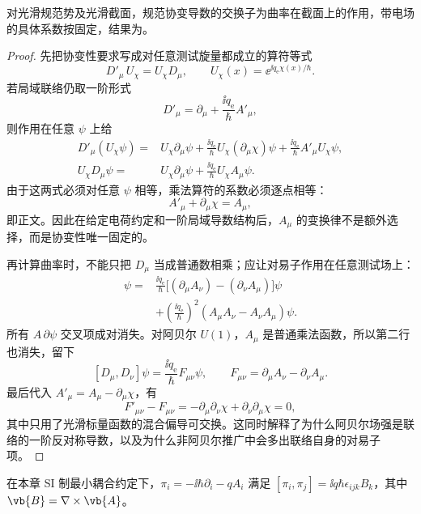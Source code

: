 \begin{lemma}[协变导数的交换子]
对光滑规范势及光滑截面，规范协变导数的交换子为曲率在截面上的作用，带电场的具体系数按固定，结果为。
\end{lemma}

\begin{proof}
先把协变性要求写成对任意测试旋量都成立的算符等式
\[
D'_\mu\,U_\chi=U_\chi D_\mu,
\qquad
U_\chi(x)=\ee^{\ii q_{\mathrm e}\chi(x)/\hbar}.
\]
若局域联络仍取一阶形式
\[
D'_\mu=\partial_\mu+\frac{\ii q_{\mathrm e}}{\hbar}A'_\mu,
\]
则作用在任意 $\psi$ 上给
\begin{align*}
D'_\mu(U_\chi\psi)
={}&U_\chi\partial_\mu\psi
+\frac{\ii q_{\mathrm e}}{\hbar}U_\chi(\partial_\mu\chi)\psi
+\frac{\ii q_{\mathrm e}}{\hbar}A'_\mu U_\chi\psi,\\
U_\chi D_\mu\psi
={}&U_\chi\partial_\mu\psi
+\frac{\ii q_{\mathrm e}}{\hbar}U_\chi A_\mu\psi.
\end{align*}
由于这两式必须对任意 $\psi$ 相等，乘法算符的系数必须逐点相等：
\[
A'_\mu+\partial_\mu\chi=A_\mu,
\]
即正文。因此在给定电荷约定和一阶局域导数结构后，$A_\mu$ 的变换律不是额外选择，而是协变性唯一固定的。

再计算曲率时，不能只把 $D_\mu$ 当成普通数相乘；应让对易子作用在任意测试场上：
\begin{align*}
[D_\mu,D_\nu]\psi
={}&\frac{\ii q_{\mathrm e}}{\hbar}
\bigl[(\partial_\mu A_\nu)-(\partial_\nu A_\mu)\bigr]\psi\\
&+\left(\frac{\ii q_{\mathrm e}}{\hbar}\right)^2
(A_\mu A_\nu-A_\nu A_\mu)\psi.
\end{align*}
所有 $A\,\partial\psi$ 交叉项成对消失。对阿贝尔 $U(1)$，$A_\mu$ 是普通乘法函数，所以第二行也消失，留下
\[
[D_\mu,D_\nu]\psi
=\frac{\ii q_{\mathrm e}}{\hbar}F_{\mu\nu}\psi,
\qquad
F_{\mu\nu}=\partial_\mu A_\nu-\partial_\nu A_\mu.
\]
最后代入 $A'_\mu=A_\mu-\partial_\mu\chi$，有
\[
F'_{\mu\nu}-F_{\mu\nu}
=-\partial_\mu\partial_\nu\chi
+\partial_\nu\partial_\mu\chi=0,
\]
其中只用了光滑标量函数的混合偏导可交换。这同时解释了为什么阿贝尔场强是联络的一阶反对称导数，以及为什么非阿贝尔推广中会多出联络自身的对易子项。
\end{proof}

\begin{lemma}[动力学动量的交换子]
在本章 SI 制最小耦合约定下，$\pi_i=-\ii\hbar\partial_i-qA_i$ 满足 $[\pi_i,\pi_j]=\ii q\hbar\epsilon_{ijk}B_k$，其中 $\vb{B}=\nabla\times\vb{A}$。
\end{lemma}

